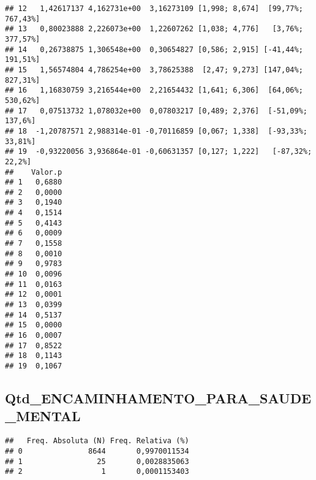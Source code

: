 \documentclass[
]{article}
\newenvironment{Shaded}{\begin{snugshade}}{\end{snugshade}}
\newcommand{\FunctionTok}[1]{\textcolor[rgb]{0.00,0.00,0.00}{#1}}
\newcommand{\NormalTok}[1]{#1}
\newcommand{\SpecialCharTok}[1]{\textcolor[rgb]{0.00,0.00,0.00}{#1}}
\begin{document}
\begin{verbatim}
## 12   1,42617137 4,162731e+00  3,16273109 [1,998; 8,674]  [99,77%; 767,43%]
## 13   0,80023888 2,226073e+00  1,22607262 [1,038; 4,776]   [3,76%; 377,57%]
## 14   0,26738875 1,306548e+00  0,30654827 [0,586; 2,915] [-41,44%; 191,51%]
## 15   1,56574804 4,786254e+00  3,78625388  [2,47; 9,273] [147,04%; 827,31%]
## 16   1,16830759 3,216544e+00  2,21654432 [1,641; 6,306]  [64,06%; 530,62%]
## 17   0,07513732 1,078032e+00  0,07803217 [0,489; 2,376]  [-51,09%; 137,6%]
## 18  -1,20787571 2,988314e-01 -0,70116859 [0,067; 1,338]  [-93,33%; 33,81%]
## 19  -0,93220056 3,936864e-01 -0,60631357 [0,127; 1,222]   [-87,32%; 22,2%]
##    Valor.p
## 1   0,6880
## 2   0,0000
## 3   0,1940
## 4   0,1514
## 5   0,4143
## 6   0,0009
## 7   0,1558
## 8   0,0010
## 9   0,9783
## 10  0,0096
## 11  0,0163
## 12  0,0001
## 13  0,0399
## 14  0,5137
## 15  0,0000
## 16  0,0007
## 17  0,8522
## 18  0,1143
## 19  0,1067
\end{verbatim}

\hypertarget{qtd_encaminhamento_para_saude_mental}{%
\subsection{Qtd\_ENCAMINHAMENTO\_PARA\_SAUDE\_MENTAL}\label{qtd_encaminhamento_para_saude_mental}}

\begin{Shaded}
\end{Shaded}

\begin{verbatim}
##   Freq. Absoluta (N) Freq. Relativa (%)
## 0               8644       0,9970011534
## 1                 25       0,0028835063
## 2                  1       0,0001153403
\end{verbatim}
\end{document}
